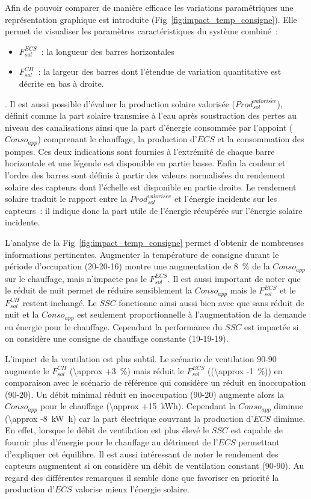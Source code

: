 Afin de pouvoir comparer de manière efficace les variations paramétriques une
représentation graphique est introduite (Fig~\ref{fig:impact_temp_consigne}). Elle permet
de visualiser les paramètres caractéristiques du système combiné~:
\begin{itemize}
    \item $F_{sol}^{ECS}$~: la longueur des barres horizontales
    \item $F_{sol}^{CH}$~: la largeur des barres dont l’étendue de variation quantitative
          est décrite en bas à droite.
\end{itemize}.
Il est aussi possible d’évaluer la production solaire valorisée
($Prod_{sol}^{valoris\acute ee}$), définit comme la part solaire transmise à l’eau après
soustraction des pertes au niveau des canalisations ainsi que la part d’énergie consommée
par l’appoint ($Conso_{app}$) comprenant le chauffage, la production d’$ECS$ et
la consommation des pompes. Ces deux indications sont fournies à l’extrémité de chaque
barre horizontale et une légende est disponible en partie basse.
Enfin la couleur et l’ordre des barres sont définis à partir des valeurs normalisées
du rendement solaire des capteurs dont l’échelle est disponible en partie droite. Le
rendement solaire traduit le rapport entre la $Prod_{sol}^{valoris\acute ee}$ et l’énergie
incidente sur les capteurs~: il indique donc la part utile de l’énergie récupérée sur
l’énergie solaire incidente.

L’analyse de la Fig~\ref{fig:impact_temp_consigne} permet d’obtenir de nombreuses
informations pertinentes. Augmenter la température de consigne durant le période
d’occupation (20-20-16) montre une augmentation de \SI{8}{\percent} de la $Conso_{app}$
sur le chauffage, mais n’impacte pas le $F_{sol}^{ECS}$. Il est aussi important de noter que le
réduit de nuit permet de réduire sensiblement la $Conso_{app}$ mais le $F_{sol}^{ECS}$ et le
$F_{sol}^{CH}$ restent inchangé. Le $SSC$ fonctionne ainsi aussi bien avec que sans réduit de
nuit et la $Conso_{app}$ est seulement proportionnelle à l’augmentation de la demande en
énergie pour le chauffage. Cependant la performance du $SSC$ est impactée si on considère
une consigne de chauffage constante (19-19-19).

L’impact de la ventilation est plus subtil. Le scénario de ventilation 90-90
augmente le $F_{sol}^{CH}$ (\SI{\approx +3}{\percent}) mais réduit le $F_{sol}^{ECS}$
((\SI{\approx -1}{\percent})) en comparaison avec le scénario de référence qui considère un
réduit en inoccupation (90-20). Un débit minimal réduit en inoccupation (90-20) augmente
alors la $Conso_{app}$ pour le chauffage (\SI{\approx +15}{kWh}). Cependant la
$Conso_{app}$ diminue (\SI{\approx -8}{\kilo\watt\hour}) car la part
électrique couvrant la production d’$ECS$ diminue. En effet, lorsque le débit de ventilation
est plus élevé le $SSC$ est capable de fournir plus d’énergie pour le chauffage au
détriment de l’$ECS$ permettant d’expliquer cet équilibre. Il est aussi intéressant de noter le
rendement des capteurs augmentent si on considère un débit de ventilation constant
(90-90). Au regard des différentes remarques il semble donc que
favoriser en priorité la production d’$ECS$ valorise mieux l’énergie solaire.

